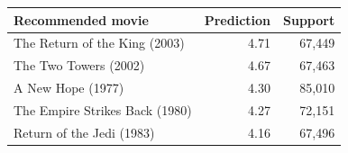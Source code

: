 \begin{tabular*}{\linewidth}{@{\extracolsep{\fill}}lrr}
\toprule
Recommended movie & Prediction & Support \\
\midrule
The Return of the King (2003) & 4.71 & 67,449 \\
The Two Towers (2002) & 4.67 & 67,463 \\
A New Hope (1977) & 4.30 & 85,010 \\
The Empire Strikes Back (1980) & 4.27 & 72,151 \\
Return of the Jedi (1983) & 4.16 & 67,496 \\
\bottomrule
\end{tabular*}

